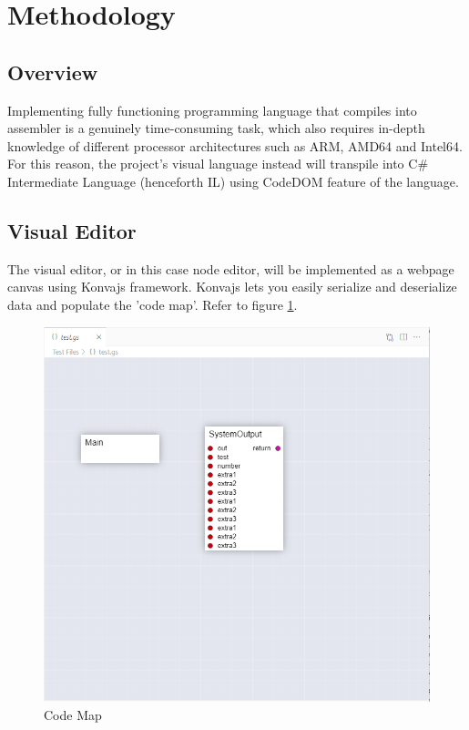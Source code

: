 \documentclass{report}
\begin{document}
\section{Methodology}
\subsection*{Overview}
Implementing fully functioning programming language that compiles into assembler is a genuinely time-consuming task, which also requires in-depth knowledge of different processor architectures such as ARM, AMD64 and Intel64. For this reason, the project's visual language instead will transpile into C\# Intermediate Language (henceforth IL) using CodeDOM feature of the language.
\subsection*{Visual Editor}
The visual editor, or in this case node editor, will be implemented as a webpage canvas using Konvajs framework.
Konvajs lets you easily serialize and deserialize data and populate the 'code map'. Refer to figure \ref{fig:codemap}.

\begin{figure}[H]
\centering
\includegraphics[width=1\textwidth]{codemap.PNG}
\caption{Code Map}
\label{fig:codemap}
\end{figure}
\end{document}
